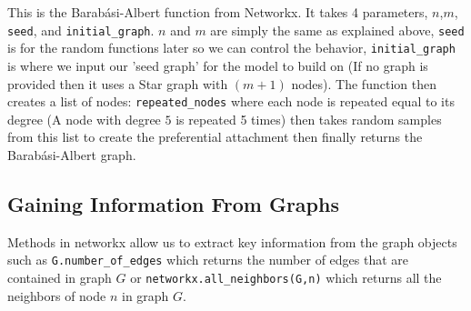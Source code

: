 \documentclass{article}
\begin{document}
        This is the Barabási-Albert function from Networkx. It takes 4 parameters, $n$,$m$, \verb|seed|, and \verb|initial_graph|. $n$ and $m$ are simply the same as explained above, \verb|seed| is for the random functions later so we can control the behavior,  \verb|initial_graph| is where we input our 'seed graph' for the model to build on (If no graph is provided then it uses a Star graph with $(m+1)$ nodes). The function then creates a list of nodes: \verb|repeated_nodes| where each node is repeated equal to its degree (A node with degree $5$ is repeated 5 times) then takes random samples from this list to create the preferential attachment then finally returns the Barabási-Albert graph. 
        
        \subsection{Gaining Information From Graphs}
        Methods in networkx allow us to extract key information from the graph objects such as \verb|G.number_of_edges| which returns the number of edges that are contained in graph $G$ or \verb|networkx.all_neighbors(G,n)| which returns all the neighbors of node $n$ in graph $G$.
            
    
    
\printbibliography
\end{document}
